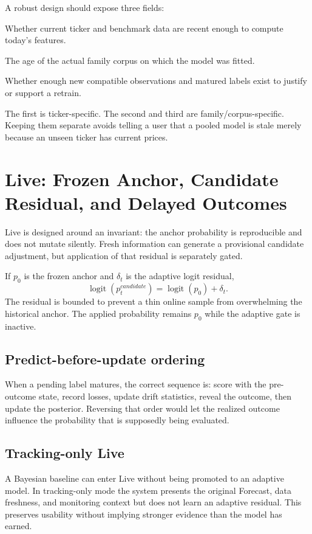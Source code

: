 \documentclass[11pt]{article}
\newcommand{\logit}{\operatorname{logit}}
\begin{document}
A robust design should expose three fields:
\begin{description}[style=nextline]
\item[Instrument data freshness] Whether current ticker and benchmark data are recent enough to compute today's features.
\item[Model training freshness] The age of the actual family corpus on which the model was fitted.
\item[Retrainability] Whether enough new compatible observations and matured labels exist to justify or support a retrain.
\end{description}
The first is ticker-specific. The second and third are family/corpus-specific. Keeping them separate avoids telling a user that a pooled model is stale merely because an unseen ticker has current prices.

\section{Live: Frozen Anchor, Candidate Residual, and Delayed Outcomes}
Live is designed around an invariant: the anchor probability is reproducible and does not mutate silently. Fresh information can generate a provisional candidate adjustment, but application of that residual is separately gated.

If $p_0$ is the frozen anchor and $\delta_t$ is the adaptive logit residual,
\begin{equation}
\logit(p_t^{candidate})=\logit(p_0)+\delta_t.
\end{equation}
The residual is bounded to prevent a thin online sample from overwhelming the historical anchor. The applied probability remains $p_0$ while the adaptive gate is inactive.

\subsection{Predict-before-update ordering}
When a pending label matures, the correct sequence is: score with the pre-outcome state, record losses, update drift statistics, reveal the outcome, then update the posterior. Reversing that order would let the realized outcome influence the probability that is supposedly being evaluated.

\subsection{Tracking-only Live}
A Bayesian baseline can enter Live without being promoted to an adaptive model. In tracking-only mode the system presents the original Forecast, data freshness, and monitoring context but does not learn an adaptive residual. This preserves usability without implying stronger evidence than the model has earned.
\end{document}
